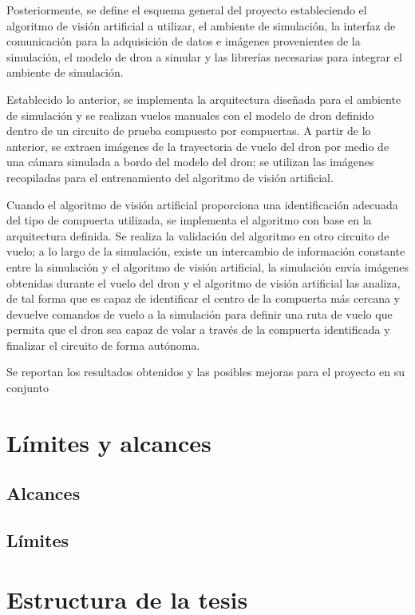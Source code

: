 Posteriormente, se define el esquema general del proyecto estableciendo el algoritmo de visión artificial a utilizar, el ambiente de simulación, la interfaz de comunicación para la adquisición de datos e imágenes provenientes de la simulación, el modelo de dron a simular y las librerías necesarias para integrar el ambiente de simulación.

Establecido lo anterior, se implementa la arquitectura diseñada para el ambiente de simulación y se realizan vuelos manuales con el modelo de dron definido dentro de un circuito de prueba compuesto por compuertas. A partir de lo anterior, se extraen imágenes de la trayectoria de vuelo del dron por medio de una cámara simulada a bordo del modelo del dron; se utilizan las imágenes recopiladas para el entrenamiento del algoritmo de visión artificial.

Cuando el algoritmo de visión artificial proporciona una identificación adecuada del tipo de compuerta utilizada, se implementa el algoritmo con base en la arquitectura definida. Se realiza la validación del algoritmo en otro circuito de vuelo; a lo largo de la simulación, existe un intercambio de información constante entre la simulación y el algoritmo de visión artificial, la simulación envía imágenes obtenidas durante el vuelo del dron y el algoritmo de visión artificial las analiza, de tal forma que es capaz de identificar el centro de la compuerta más cercana y devuelve comandos de vuelo a la simulación para definir una ruta de vuelo que permita que el dron sea capaz de volar a través de la compuerta identificada y finalizar el circuito de forma autónoma.

Se reportan los resultados obtenidos y las posibles mejoras para el proyecto en su conjunto



\section{Límites y alcances}

\subsection{Alcances}


\subsection{Límites}



\section{Estructura de la tesis}






